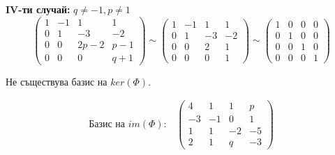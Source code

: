 \documentclass{article}
\begin{document}
\textbf{IV-ти случай:} $q\neq-1, p\neq1$
\[
    \left(\begin{array}{cccc}
            1 & -1 & 1    & 1   \\
            0 & 1  & -3   & -2  \\
            0 & 0  & 2p-2 & p-1 \\
            0 & 0  & 0    & q+1
        \end{array}\right)
    \sim\left(\begin{array}{cccc}
            1 & -1 & 1  & 1  \\
            0 & 1  & -3 & -2 \\
            0 & 0  & 2  & 1  \\
            0 & 0  & 0  & 1
        \end{array}\right)
    \sim\left(\begin{array}{cccc}
            1 & 0 & 0 & 0 \\
            0 & 1 & 0 & 0 \\
            0 & 0 & 1 & 0 \\
            0 & 0 & 0 & 1
        \end{array}\right)
\]
\begin{center}
    Не съществува базис на $ker(\Phi)$.
\end{center}
\begin{align*}
    \text{Базис на $im(\Phi):$} &
    \left(\begin{array}{cccc}
                  4  & 1  & 1  & p  \\
                  -3 & -1 & 0  & 1  \\
                  1  & 1  & -2 & -5 \\
                  2  & 1  & q  & -3
              \end{array}\right)
\end{align*}
\end{document}
